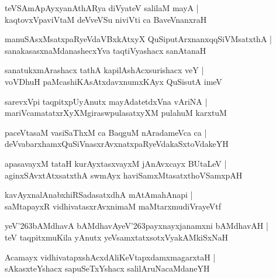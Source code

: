 \documentclass[twoside,12pt,openright]{book}
\def\S{\char'263}
\newcounter{shloka}[chapter]
\begin{document}
\begin{shloka}%
teVSAmApAyxyanAthARya diVyateV salilaM mayA |\\
kaqtovxVpaviVtaM deVveVSu niviVti ca BaveVnanxraH 
\end{shloka}

\begin{shloka}%
manuSAsxMsatxpaRyeVdaVBxkAtxyX QuSiputArxnanxqqSiVMsatxthA |\\
sanakasasxnaMdanashecxYva taqtiVyashacx sanAtanaH 
\end{shloka}

\begin{shloka}%
sanatukxmArashacx tathA kapilAshAcxsurishacx veY |\\
voVDhuH paMcashiKAsAtxdavxnumxKAyx QuSisutA imeV 
\end{shloka}

\begin{shloka}%
sarevxVpi taqpitxpUyAnutx mayAdatetdxVna vAriNA |\\
mariVcamatatxrXyXMgiraswpulasatxyXM pulahuM karxtuM 
\end{shloka}

\begin{shloka}%
paceVtasaM vasiSaThxM ca BaqguM nAradameVca ca |\\
deVvabarxhamxQuSiVnasxrAvxnatxpaRyeVdakaSxtoVdakeYH
\end{shloka}

\begin{shloka}%
apasavayxM tataH kurAyxtasxvayxM jAnAvxcayx BUtaLeV |\\
aginxSAvxtAtxsatxthA swmAyx haviSamxMtasatxthoVSamxpAH 
\end{shloka}

\begin{shloka}%
kavAyxnalAnabxhiRSadasatxdhA mAtAmahAnapi |\\
saMtapayxR vidhivatasxrAvxnimaM maMtarxmudiVrayeVtf 
\end{shloka}

\begin{shloka}%
yeV\S bAMdhavA bAMdhavAyeV\S payxnayxjanamxni bAMdhavAH |\\
teV taqpitxmuKila yAnutx yeVsamxtatxsotxVyakAMkiSxNaH 
\end{shloka}

\begin{shloka}%
Acamayx vidhivatapxshAcxdAliKeVtapxdamxmagarxtaH |\\
sAkasxteYshacx sapuSeTxYshacx salilAruNacaMdaneYH
\end{shloka}
\end{document}

